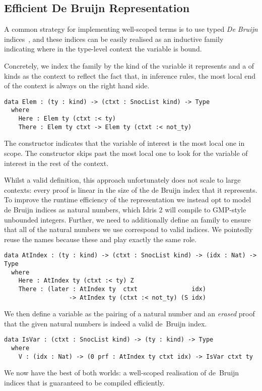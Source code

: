 \subsection{Efficient De Bruijn Representation}
\label{sec:design:deBruijn}

A common strategy for implementing well-scoped terms is to use typed
\emph{De Bruijn} indices~\cite{MANUAL:journals/math/debruijn72}, and these indices can be easily realised as an inductive family~\cite{DBLP:journals/fac/Dybjer94}
indicating where in the type-level context the variable is bound.

Concretely, we index the  family by the kind of the variable it represents and a  of kinds as the context to reflect the fact that,
in inference rules, the most local end of the context is always on the right hand side.

\begin{Verbatim}
data Elem : (ty : kind) -> (ctxt : SnocList kind) -> Type
  where
    Here : Elem ty (ctxt :< ty)
    There : Elem ty ctxt -> Elem ty (ctxt :< not_ty)
\end{Verbatim}

The  constructor indicates that the variable of interest is
the most local one in scope.
%
The  constructor skips past the most local one to look for
the variable of interest in the rest of the context.

Whilst a valid definition, this approach unfortunately does not scale to
large contexts: every  proof is linear in the size of the de Bruijn
index that it represents.
%
To improve the runtime efficiency of the representation we instead opt to
model de Bruijn indices as natural numbers, which Idris 2 will compile to
GMP-style unbounded integers.
%
Further, we need to additionally define an  family to ensure that
all of the natural numbers we use correspond to valid indices.
%
We pointedly reuse the  names because these 
and  play exactly the same role.

\begin{Verbatim}
data AtIndex : (ty : kind) -> (ctxt : SnocList kind) -> (idx : Nat) -> Type
  where
    Here : AtIndex ty (ctxt :< ty) Z
    There : (later : AtIndex ty  ctxt               idx)
                  -> AtIndex ty (ctxt :< not_ty) (S idx)
\end{Verbatim}

\noindent
We then define a variable as the pairing of a natural number and an \emph{erased}
proof that the given natural numbers is indeed a valid de~Bruijn index.

\begin{Verbatim}
data IsVar : (ctxt : SnocList kind) -> (ty : kind) -> Type
  where
    V : (idx : Nat) -> (0 prf : AtIndex ty ctxt idx) -> IsVar ctxt ty
\end{Verbatim}

We now have the best of both worlds: a well-scoped realisation of de~Bruijn indices
that is guaranteed to be compiled efficiently.


